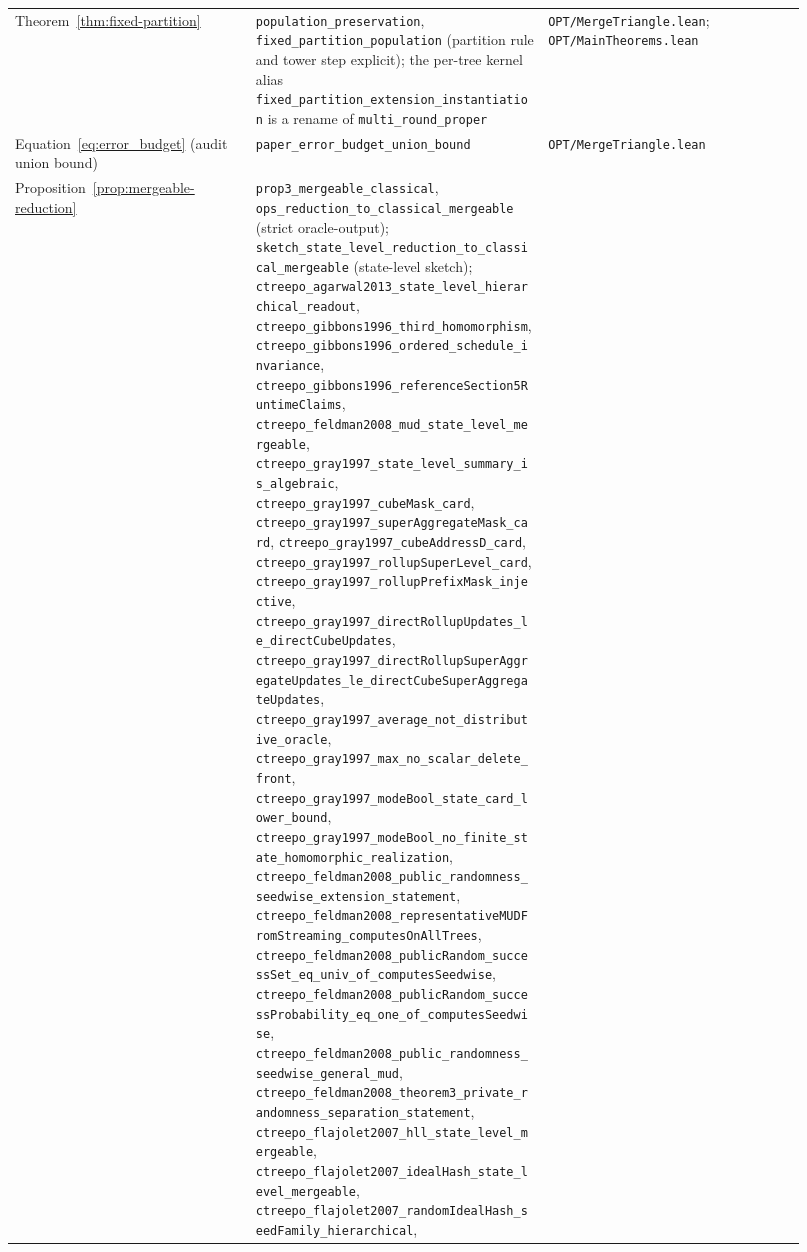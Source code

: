 {\begin{longtable}{p{0.28\linewidth}p{0.34\linewidth}p{0.30\linewidth}}
Theorem~\ref{thm:fixed-partition} &
\texttt{population\_preservation}, \texttt{fixed\_partition\_population}
(partition rule and tower step explicit); the per-tree kernel alias
\texttt{fixed\_partition\_extension\_instantiation} is a rename of
\texttt{multi\_round\_proper} &
\texttt{OPT/MergeTriangle.lean}; \texttt{OPT/MainTheorems.lean} \\

Equation~\eqref{eq:error_budget} (audit union bound) &
\texttt{paper\_error\_budget\_union\_bound} &
\texttt{OPT/MergeTriangle.lean} \\

Proposition~\ref{prop:mergeable-reduction} &
\texttt{prop3\_mergeable\_classical}, \texttt{ops\_reduction\_to\_classical\_mergeable} (strict oracle-output);
\texttt{sketch\_state\_level\_reduction\_to\_classical\_mergeable} (state-level sketch);
\texttt{ctreepo\_agarwal2013\_state\_level\_hierarchical\_readout},
\texttt{ctreepo\_gibbons1996\_third\_homomorphism},
\texttt{ctreepo\_gibbons1996\_ordered\_schedule\_invariance},
\nolinkurl{ctreepo_gibbons1996_referenceSection5RuntimeClaims},
\texttt{ctreepo\_feldman2008\_mud\_state\_level\_mergeable},
\texttt{ctreepo\_gray1997\_state\_level\_summary\_is\_algebraic},
\texttt{ctreepo\_gray1997\_cubeMask\_card},
\texttt{ctreepo\_gray1997\_superAggregateMask\_card},
\texttt{ctreepo\_gray1997\_cubeAddressD\_card},
\texttt{ctreepo\_gray1997\_rollupSuperLevel\_card},
\texttt{ctreepo\_gray1997\_rollupPrefixMask\_injective},
\nolinkurl{ctreepo_gray1997_directRollupUpdates_le_directCubeUpdates},
\nolinkurl{ctreepo_gray1997_directRollupSuperAggregateUpdates_le_directCubeSuperAggregateUpdates},
\texttt{ctreepo\_gray1997\_average\_not\_distributive\_oracle},
\texttt{ctreepo\_gray1997\_max\_no\_scalar\_delete\_front},
\nolinkurl{ctreepo_gray1997_modeBool_state_card_lower_bound},
\nolinkurl{ctreepo_gray1997_modeBool_no_finite_state_homomorphic_realization},
\texttt{ctreepo\_feldman2008\_public\_randomness\_seedwise\_extension\_statement},
\nolinkurl{ctreepo_feldman2008_representativeMUDFromStreaming_computesOnAllTrees},
\nolinkurl{ctreepo_feldman2008_publicRandom_successSet_eq_univ_of_computesSeedwise},
\nolinkurl{ctreepo_feldman2008_publicRandom_successProbability_eq_one_of_computesSeedwise},
\nolinkurl{ctreepo_feldman2008_public_randomness_seedwise_general_mud},
\texttt{ctreepo\_feldman2008\_theorem3\_private\_randomness\_separation\_statement},
\texttt{ctreepo\_flajolet2007\_hll\_state\_level\_mergeable},
\texttt{ctreepo\_flajolet2007\_idealHash\_state\_level\_mergeable},
\nolinkurl{ctreepo_flajolet2007_randomIdealHash_seedFamily_hierarchical},

\end{longtable}}
